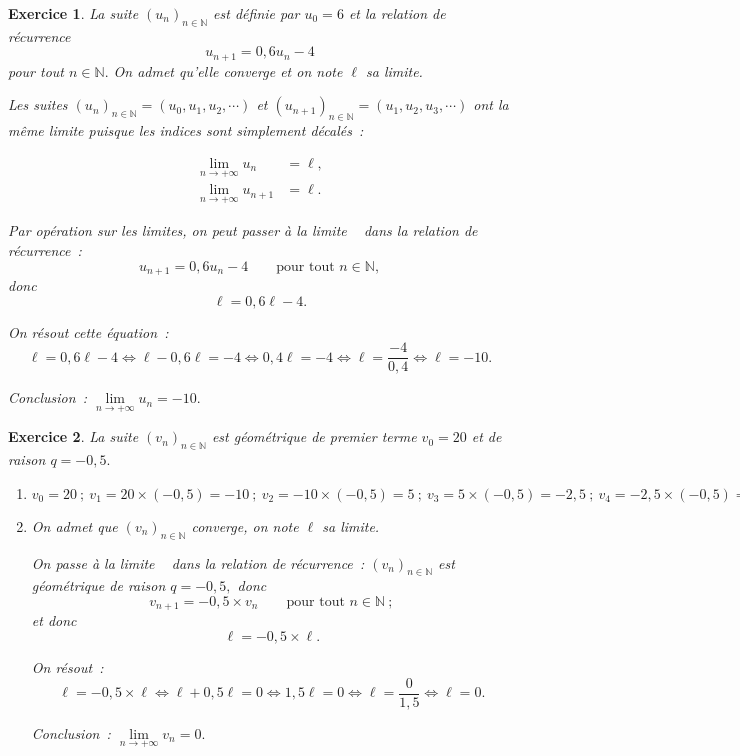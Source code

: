 \documentclass[10pt]{article}
\newtheorem{exo}{Exercice}
\begin{document}
\begin{exo}

La suite $(u_n)_{n\in\mathbb{N}}$ est définie par $u_0=6$ et la relation de récurrence \[u_{n+1}=0,6u_n-4\] pour tout $n\in\mathbb{N}.$ On admet qu'elle converge et on note $\ell$ sa limite.

\medskip

Les suites $\left(u_n\right)_{n\in\mathbb{N}}=\left(u_0,u_1,u_2,\cdots\right)$ et $\left(u_{n+1}\right)_{n\in\mathbb{N}}=\left(u_1,u_2,u_3,\cdots\right)$ ont la même limite   puisque les indices sont simplement décalés~:

\begin{align*}
\lim\limits_{n\to +\infty}u_n&=\ell,\\
\lim\limits_{n\to +\infty}u_{n+1}&=\ell.
\end{align*}

 Par opération sur les limites, on peut \og passer à la limite \fg~{} dans la relation de récurrence~:
\[u_{n+1}=0,6u_n-4\qquad\text{pour tout }n\in\mathbb{N},\] donc
\[\ell=0,6\ell-4.\]

On résout cette équation~:
\[\ell=0,6\ell-4\iff \ell-0,6\ell=-4\iff 0,4\ell=-4\iff\ell=\frac{-4}{0,4}\iff \ell=-10.\]

Conclusion~: $\lim\limits_{n\to +\infty}u_n=-10.$
\end{exo}


\begin{exo}

La suite $\left(v_n\right)_{n\in\mathbb{N}}$ est géométrique de premier terme $v_0=20$ et de raison $q=-0,5.$

\begin{enumerate}
\item $v_0=20~;~v_1=20\times (-0,5)=-10~;~v_2=-10\times (-0,5)=5~;~v_3=5\times (-0,5)=-2,5~;~v_4=-2,5\times (-0,5)=1,25.$
\item On admet que $\left(v_n\right)_{n\in\mathbb{N}}$ converge, on note $\ell$ sa limite.

\medskip
On \og passe à la limite \fg~{} dans la relation de récurrence~: $\left(v_n\right)_{n\in\mathbb{N}}$ est géométrique de raison $q=-0,5,$ donc
\[v_{n+1}=-0,5\times v_n\qquad\text{pour tout }n\in\mathbb{N}~;\] et donc
\[\ell=-0,5\times\ell.\]

On résout~:
\[\ell=-0,5\times\ell\iff\ell+0,5\ell=0\iff 1,5\ell=0\iff \ell=\frac{0}{1,5}\iff\ell=0.\]

Conclusion~: $\lim\limits_{n\to +\infty}v_n=0.$

\end{enumerate}

\end{exo}
\end{document}
